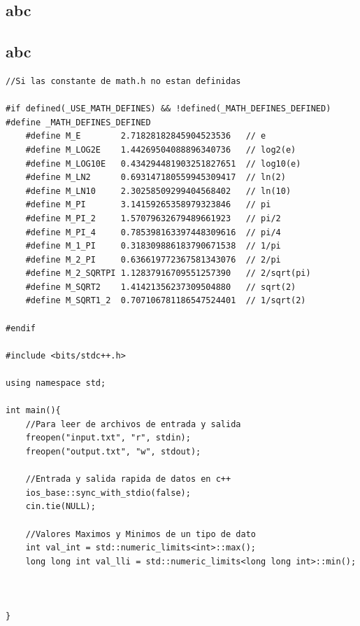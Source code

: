 \documentclass[twoside]{article}
\begin{document}
\selectfont
    \begin{multicols*}{2}
    \color{coolgray}
        \tableofcontents
        \newpage
\sectionfont{\bfseries\sffamily\centering\Huge}
\vspace{1em}
\section*{abc}
\vspace{3em}
\subsectionfont{\large\bfseries\sffamily\underline}
\subsection*{abc}
\begin{verbatim}
//Si las constante de math.h no estan definidas

#if defined(_USE_MATH_DEFINES) && !defined(_MATH_DEFINES_DEFINED)
#define _MATH_DEFINES_DEFINED
	#define M_E        2.71828182845904523536	// e
	#define M_LOG2E    1.44269504088896340736	// log2(e)
	#define M_LOG10E   0.434294481903251827651	// log10(e)
	#define M_LN2      0.693147180559945309417	// ln(2)
	#define M_LN10     2.30258509299404568402	// ln(10)
	#define M_PI       3.14159265358979323846	// pi
	#define M_PI_2     1.57079632679489661923	// pi/2
	#define M_PI_4     0.785398163397448309616	// pi/4
	#define M_1_PI     0.318309886183790671538	// 1/pi
	#define M_2_PI     0.636619772367581343076	// 2/pi
	#define M_2_SQRTPI 1.12837916709551257390	// 2/sqrt(pi)
	#define M_SQRT2    1.41421356237309504880	// sqrt(2)
	#define M_SQRT1_2  0.707106781186547524401	// 1/sqrt(2)

#endif

#include <bits/stdc++.h>

using namespace std;

int main(){
	//Para leer de archivos de entrada y salida
	freopen("input.txt", "r", stdin);
	freopen("output.txt", "w", stdout);

	//Entrada y salida rapida de datos en c++
	ios_base::sync_with_stdio(false);
	cin.tie(NULL);

	//Valores Maximos y Minimos de un tipo de dato
	int val_int = std::numeric_limits<int>::max();
	long long int val_lli = std::numeric_limits<long long int>::min();



}

\end{verbatim}


\end{multicols*}
\end{document}
